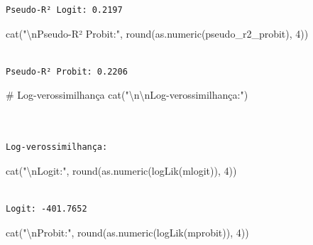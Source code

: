 \documentclass[
  letterpaper,
  DIV=11,
  numbers=noendperiod]{scrartcl}
\newenvironment{Shaded}{\begin{snugshade}}{\end{snugshade}}
\newcommand{\CommentTok}[1]{\textcolor[rgb]{0.37,0.37,0.37}{#1}}
\newcommand{\DecValTok}[1]{\textcolor[rgb]{0.68,0.00,0.00}{#1}}
\newcommand{\FunctionTok}[1]{\textcolor[rgb]{0.28,0.35,0.67}{#1}}
\newcommand{\NormalTok}[1]{\textcolor[rgb]{0.00,0.23,0.31}{#1}}
\newcommand{\SpecialCharTok}[1]{\textcolor[rgb]{0.37,0.37,0.37}{#1}}
\newcommand{\StringTok}[1]{\textcolor[rgb]{0.13,0.47,0.30}{#1}}
\begin{document}
\begin{verbatim}
Pseudo-R² Logit: 0.2197
\end{verbatim}

\begin{Shaded}
\begin{Highlighting}[]
\FunctionTok{cat}\NormalTok{(}\StringTok{"}\SpecialCharTok{\textbackslash{}n}\StringTok{Pseudo{-}R² Probit:"}\NormalTok{, }\FunctionTok{round}\NormalTok{(}\FunctionTok{as.numeric}\NormalTok{(pseudo\_r2\_probit), }\DecValTok{4}\NormalTok{))}
\end{Highlighting}
\end{Shaded}

\begin{verbatim}

Pseudo-R² Probit: 0.2206
\end{verbatim}

\begin{Shaded}
\begin{Highlighting}[]
\CommentTok{\# Log{-}verossimilhança}
\FunctionTok{cat}\NormalTok{(}\StringTok{"}\SpecialCharTok{\textbackslash{}n\textbackslash{}n}\StringTok{Log{-}verossimilhança:"}\NormalTok{)}
\end{Highlighting}
\end{Shaded}

\begin{verbatim}


Log-verossimilhança:
\end{verbatim}

\begin{Shaded}
\begin{Highlighting}[]
\FunctionTok{cat}\NormalTok{(}\StringTok{"}\SpecialCharTok{\textbackslash{}n}\StringTok{Logit:"}\NormalTok{, }\FunctionTok{round}\NormalTok{(}\FunctionTok{as.numeric}\NormalTok{(}\FunctionTok{logLik}\NormalTok{(mlogit)), }\DecValTok{4}\NormalTok{))}
\end{Highlighting}
\end{Shaded}

\begin{verbatim}

Logit: -401.7652
\end{verbatim}

\begin{Shaded}
\begin{Highlighting}[]
\FunctionTok{cat}\NormalTok{(}\StringTok{"}\SpecialCharTok{\textbackslash{}n}\StringTok{Probit:"}\NormalTok{, }\FunctionTok{round}\NormalTok{(}\FunctionTok{as.numeric}\NormalTok{(}\FunctionTok{logLik}\NormalTok{(mprobit)), }\DecValTok{4}\NormalTok{))}
\end{Highlighting}
\end{Shaded}
\end{document}
